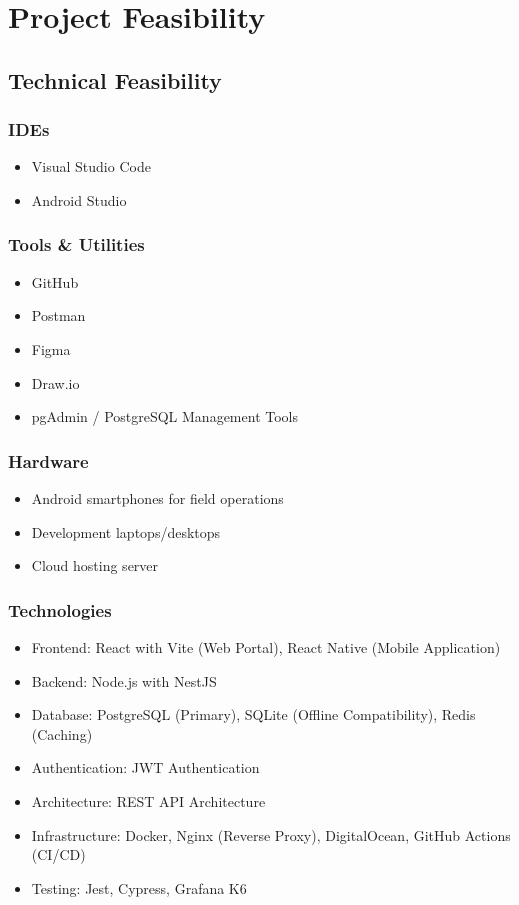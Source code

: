 \section{Project Feasibility}
\label{sec:feasibility}

\subsection{Technical Feasibility}

\subsubsection{IDEs}
\begin{itemize}
    \item Visual Studio Code
    \item Android Studio
\end{itemize}

\subsubsection{Tools \& Utilities}
\begin{itemize}
    \item GitHub
    \item Postman
    \item Figma
    \item Draw.io
    \item pgAdmin / PostgreSQL Management Tools
\end{itemize}

\subsubsection{Hardware}
\begin{itemize}
    \item Android smartphones for field operations
    \item Development laptops/desktops
    \item Cloud hosting server
\end{itemize}

\subsubsection{Technologies}
\begin{itemize}
    \item Frontend: React with Vite (Web Portal), React Native (Mobile Application)
    \item Backend: Node.js with NestJS
    \item Database: PostgreSQL (Primary), SQLite (Offline Compatibility), Redis (Caching)
    \item Authentication: JWT Authentication
    \item Architecture: REST API Architecture
    \item Infrastructure: Docker, Nginx (Reverse Proxy), DigitalOcean, GitHub Actions (CI/CD)
    \item Testing: Jest, Cypress, Grafana K6
\end{itemize}

